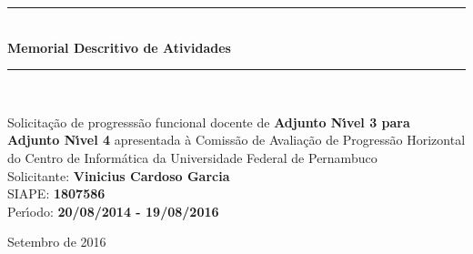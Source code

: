 \documentclass[a4paper,oneside,10pt]{article}
\begin{document}
\begin{titlepage}

\vspace{-5.0cm}

\begin{figure}[!htb]
 \label{fig:UFPE_logo}
\end{figure}

\begin{center}
\vspace{1cm}
\rule{1.0\textwidth}{1pt} \\ [0.5cm]
{\Huge \textbf{\textsf{Memorial Descritivo de Atividades}}} \\
\rule{1.0\textwidth}{1pt} \\
\vspace{2cm}

\doublespacing
{\Large \textsf{Solicita\c{c}\~{a}o de progresss\~{a}o funcional docente de \textbf{Adjunto N\'{\i}vel 3 para Adjunto N\'{\i}vel 4} apresentada \`{a} Comiss\~{a}o de Avalia\c{c}\~{a}o de Progress\~{a}o Horizontal do Centro de Inform\'{a}tica da Universidade Federal de Pernambuco}}\\
\vspace{1.5cm}
{\LARGE \textsf{Solicitante: \textbf{Vinicius Cardoso Garcia}}}\\
\vspace{0.5cm}
{\Large \textsf{SIAPE: \textbf{1807586}}} \\
\vspace{0.5cm}
{\Large \textsf{Per\'{\i}odo: \textbf{20/08/2014 - 19/08/2016}}} \\

\vspace{2.0cm}

\normalsize \textsf{Setembro de 2016}

\end{center}
\thispagestyle{empty}
\end{titlepage}


\tableofcontents
\end{document}
